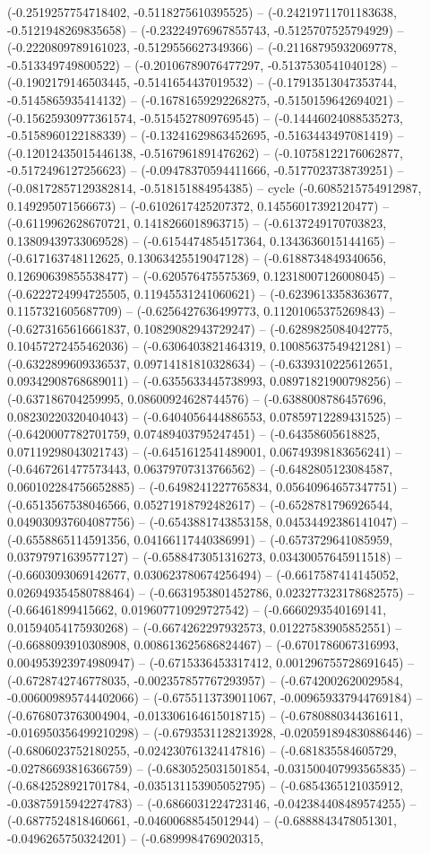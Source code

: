 (-0.2519257754718402, -0.5118275610395525) -- (-0.24219711701183638, -0.5121948269835658) -- (-0.23224976967855743, -0.5125707525794929) -- (-0.2220809789161023, -0.5129556627349366) -- (-0.21168795932069778, -0.513349749800522) -- (-0.20106789076477297, -0.5137530541040128) -- (-0.1902179146503445, -0.5141654437019532) -- (-0.17913513047353744, -0.5145865935414132) -- (-0.16781659292268275, -0.5150159642694021) -- (-0.15625930977361574, -0.5154527809769545) -- (-0.14446024088535273, -0.5158960122188339) -- (-0.13241629863452695, -0.5163443497081419) -- (-0.12012435015446138, -0.5167961891476262) -- (-0.10758122176062877, -0.5172496127256623) -- (-0.09478370594411666, -0.5177023738739251) -- (-0.08172857129382814, -0.518151884954385) -- cycle
	(-0.6085215754912987, 0.149295071566673) -- (-0.6102617425207372, 0.14556017392120477) -- (-0.6119962628670721, 0.1418266018963715) -- (-0.6137249170703823, 0.13809439733069528) -- (-0.6154474854517364, 0.1343636015144165) -- (-0.617163748112625, 0.13063425519047128) -- (-0.6188734849340656, 0.12690639855538477) -- (-0.620576475575369, 0.12318007126008045) -- (-0.6222724994725505, 0.11945531241060621) -- (-0.6239613358363677, 0.1157321605687709) -- (-0.6256427636499773, 0.11201065375269843) -- (-0.6273165616661837, 0.10829082943729247) -- (-0.6289825084042775, 0.10457272455462036) -- (-0.6306403821464319, 0.10085637549421281) -- (-0.6322899609336537, 0.09714181810328634) -- (-0.6339310225612651, 0.09342908768689011) -- (-0.6355633445738993, 0.08971821900798256) -- (-0.637186704259995, 0.08600924628744576) -- (-0.6388008786457696, 0.08230220320404043) -- (-0.6404056444886553, 0.07859712289431525) -- (-0.6420007782701759, 0.07489403795247451) -- (-0.64358605618825, 0.07119298043021743) -- (-0.6451612541489001, 0.06749398183656241) -- (-0.6467261477573443, 0.06379707313766562) -- (-0.6482805123084587, 0.060102284756652885) -- (-0.6498241227765834, 0.05640964657347751) -- (-0.6513567538046566, 0.05271918792482617) -- (-0.6528781796926544, 0.049030937604087756) -- (-0.6543881743853158, 0.04534492386141047) -- (-0.6558865114591356, 0.04166117440386991) -- (-0.6573729641085959, 0.03797971639577127) -- (-0.6588473051316273, 0.03430057645911518) -- (-0.6603093069142677, 0.030623780674256494) -- (-0.6617587414145052, 0.026949354580788464) -- (-0.6631953801452786, 0.023277323178682575) -- (-0.66461899415662, 0.019607710929727542) -- (-0.6660293540169141, 0.01594054175930268) -- (-0.6674262297932573, 0.01227583905852551) -- (-0.6688093910308908, 0.008613625686824467) -- (-0.6701786067316993, 0.004953923974980947) -- (-0.6715336453317412, 0.001296755728691645) -- (-0.6728742746778035, -0.002357857767293957) -- (-0.6742002620029584, -0.006009895744402066) -- (-0.6755113739011067, -0.009659337944769184) -- (-0.6768073763004904, -0.013306164615018715) -- (-0.6780880344361611, -0.016950356499210298) -- (-0.6793531128213928, -0.020591894830886446) -- (-0.6806023752180255, -0.024230761324147816) -- (-0.681835584605729, -0.02786693816366759) -- (-0.6830525031501854, -0.031500407993565835) -- (-0.6842528921701784, -0.035131153905052795) -- (-0.6854365121035912, -0.03875915942274783) -- (-0.6866031224723146, -0.042384408489574255) -- (-0.6877524818460661, -0.04600688545012944) -- (-0.6888843478051301, -0.0496265750324201) -- (-0.6899984769020315, 